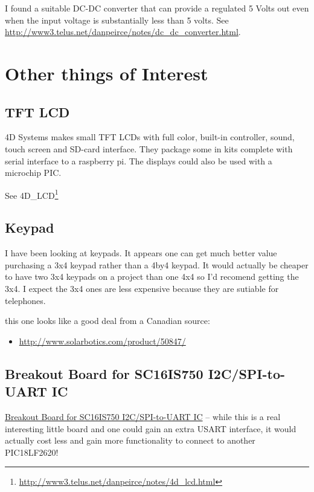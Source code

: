 \documentclass[twocolumn]{article}
\begin{document}
I found a suitable DC-DC converter that can provide a regulated 5 Volts
out even when the input voltage is substantially less than 5 volts. See
\url{http://www3.telus.net/danpeirce/notes/dc_dc_converter.html}.

\section{Other things of Interest}

\subsection{TFT LCD}

4D Systems makes small TFT LCDs with full color, built-in controller,
sound, touch screen and SD-card interface. They package some in kits
complete with serial interface to a raspberry pi. The displays could
also be used with a microchip PIC.

See 4D\_LCD\footnote{\url{http://www3.telus.net/danpeirce/notes/4d_lcd.html}}

\subsection{Keypad}

I have been looking at keypads. It appears one can get much better value
purchasing a 3x4 keypad rather than a 4by4 keypad. It would actually be
cheaper to have two 3x4 keypads on a project than one 4x4 so I'd
recomend getting the 3x4. I expect the 3x4 ones are less expensive
because they are sutiable for telephones.

this one looks like a good deal from a Canadian source:

\begin{itemize}
\item
  \url{http://www.solarbotics.com/product/50847/}
\end{itemize}

\subsection{Breakout Board for SC16IS750 I2C/SPI-to-UART IC}

\href{http://www.sparkfun.com/products/9981}{Breakout Board for
SC16IS750 I2C/SPI-to-UART IC} -- while this is a real interesting little
board and one could gain an extra USART interface, it would actually
cost less and gain more functionality to connect to another PIC18LF2620!
\end{document}
